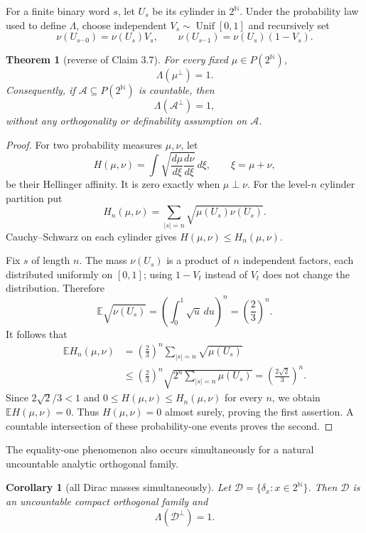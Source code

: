 \documentclass[11pt]{article}
\newtheorem{theorem}{Theorem}
\newtheorem{corollary}{Corollary}
\newcommand{\E}{\mathbb E}
\begin{document}
For a finite binary word $s$, let $U_s$ be its cylinder in $2^{\mathbb N}$.
Under the probability law used to define $\Lambda$, choose independent
$V_s\sim\operatorname{Unif}[0,1]$ and recursively set
\[
 \nu(U_{s^\frown0})=\nu(U_s)V_s,
 \qquad
 \nu(U_{s^\frown1})=\nu(U_s)(1-V_s).
\]

\begin{theorem}[reverse of Claim 3.7]\label{thm:lambda}
For every fixed $\mu\in P(2^{\mathbb N})$,
\[
                         \Lambda(\mu^\perp)=1.
\]
Consequently, if $\mathcal A\subseteq P(2^{\mathbb N})$ is countable, then
\[
                         \Lambda(\mathcal A^\perp)=1,
\]
without any orthogonality or definability assumption on $\mathcal A$.
\end{theorem}

\begin{proof}
For two probability measures $\mu,\nu$, let
\[
 H(\mu,\nu)=\int\sqrt{\frac{d\mu}{d\xi}\frac{d\nu}{d\xi}}\,d\xi,
 \qquad \xi=\mu+\nu,
\]
be their Hellinger affinity.  It is zero exactly when $\mu\perp\nu$.
For the level-$n$ cylinder partition put
\[
 H_n(\mu,\nu)=\sum_{|s|=n}\sqrt{\mu(U_s)\nu(U_s)}.
\]
Cauchy--Schwarz on each cylinder gives $H(\mu,\nu)\leq H_n(\mu,\nu)$.

Fix $s$ of length $n$.  The mass $\nu(U_s)$ is a product of $n$ independent
factors, each distributed uniformly on $[0,1]$; using $1-V_t$ instead of
$V_t$ does not change the distribution.  Therefore
\[
 \E\sqrt{\nu(U_s)}
 =\left(\int_0^1\sqrt u\,du\right)^n
 =\left(\frac23\right)^n.
\]
It follows that
\begin{align*}
 \E H_n(\mu,\nu)
 &=\left(\frac23\right)^n\sum_{|s|=n}\sqrt{\mu(U_s)}\\
 &\leq\left(\frac23\right)^n
 \sqrt{2^n\sum_{|s|=n}\mu(U_s)}
 =\left(\frac{2\sqrt2}{3}\right)^n.
\end{align*}
Since $2\sqrt2/3<1$ and $0\leq H(\mu,\nu)\leq H_n(\mu,\nu)$ for every $n$,
we obtain $\E H(\mu,\nu)=0$.  Thus $H(\mu,\nu)=0$ almost surely, proving
the first assertion.  A countable intersection of these probability-one
events proves the second.
\end{proof}

The equality-one phenomenon also occurs simultaneously for a natural
uncountable analytic orthogonal family.

\begin{corollary}[all Dirac masses simultaneously]\label{cor:dirac}
Let $\mathcal D=\{\delta_x:x\in2^{\mathbb N}\}$.  Then $\mathcal D$ is an
uncountable compact orthogonal family and
\[
                         \Lambda(\mathcal D^\perp)=1.
\]
\end{corollary}
\end{document}
